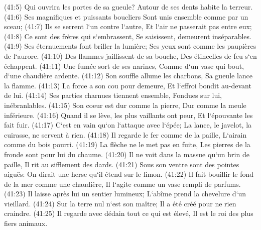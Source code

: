 \verse (41:5) Qui ouvrira les portes de sa gueule? Autour de ses dents habite la terreur. 
\verse (41:6) Ses magnifiques et puissants boucliers Sont unis ensemble comme par un sceau; 
\verse (41:7) Ils se serrent l`un contre l`autre, Et l`air ne passerait pas entre eux; 
\verse (41:8) Ce sont des frères qui s`embrassent, Se saisissent, demeurent inséparables. 
\verse (41:9) Ses éternuements font briller la lumière; Ses yeux sont comme les paupières de l`aurore. 
\verse (41:10) Des flammes jaillissent de sa bouche, Des étincelles de feu s`en échappent. 
\verse (41:11) Une fumée sort de ses narines, Comme d`un vase qui bout, d`une chaudière ardente. 
\verse (41:12) Son souffle allume les charbons, Sa gueule lance la flamme. 
\verse (41:13) La force a son cou pour demeure, Et l`effroi bondit au-devant de lui. 
\verse (41:14) Ses parties charnues tiennent ensemble, Fondues sur lui, inébranlables. 
\verse (41:15) Son coeur est dur comme la pierre, Dur comme la meule inférieure. 
\verse (41:16) Quand il se lève, les plus vaillants ont peur, Et l`épouvante les fait fuir. 
\verse (41:17) C`est en vain qu`on l`attaque avec l`épée; La lance, le javelot, la cuirasse, ne servent à rien. 
\verse (41:18) Il regarde le fer comme de la paille, L`airain comme du bois pourri. 
\verse (41:19) La flèche ne le met pas en fuite, Les pierres de la fronde sont pour lui du chaume. 
\verse (41:20) Il ne voit dans la massue qu`un brin de paille, Il rit au sifflement des dards. 
\verse (41:21) Sous son ventre sont des pointes aiguës: On dirait une herse qu`il étend sur le limon. 
\verse (41:22) Il fait bouillir le fond de la mer comme une chaudière, Il l`agite comme un vase rempli de parfums. 
\verse (41:23) Il laisse après lui un sentier lumineux; L`abîme prend la chevelure d`un vieillard. 
\verse (41:24) Sur la terre nul n`est son maître; Il a été créé pour ne rien craindre. 
\verse (41:25) Il regarde avec dédain tout ce qui est élevé, Il est le roi des plus fiers animaux. 


